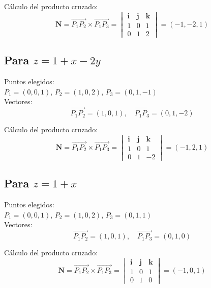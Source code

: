 \documentclass{article}
\begin{document}
Cálculo del producto cruzado:
\begin{equation*}
    \mathbf{N} = \overrightarrow{P_1P_2} \times \overrightarrow{P_1P_3} =
    \begin{vmatrix} 
    \mathbf{i} & \mathbf{j} & \mathbf{k} \\
    1 & 0 & 1 \\
    0 & 1 & 2
    \end{vmatrix} = (-1, -2, 1)
\end{equation*}

\subsection{Para $z = 1 + x - 2y$}
Puntos elegidos: \\ 
$P_1 = (0,0,1)$, $P_2 = (1,0,2)$, $P_3 = (0,1,-1)$ \\  
Vectores:
\begin{equation*}
    \overrightarrow{P_1P_2} = (1,0,1), \quad \overrightarrow{P_1P_3} = (0,1,-2)
\end{equation*}

Cálculo del producto cruzado:
\begin{equation*}
    \mathbf{N} = \overrightarrow{P_1P_2} \times \overrightarrow{P_1P_3} =
    \begin{vmatrix} 
    \mathbf{i} & \mathbf{j} & \mathbf{k} \\
    1 & 0 & 1 \\
    0 & 1 & -2
    \end{vmatrix} = (-1, 2, 1)
\end{equation*}

\subsection{Para $z = 1 + x$}
Puntos elegidos: \\ 
$P_1 = (0,0,1)$, $P_2 = (1,0,2)$, $P_3 = (0,1,1)$ \\  
Vectores:
\begin{equation*}
    \overrightarrow{P_1P_2} = (1,0,1), \quad \overrightarrow{P_1P_3} = (0,1,0)
\end{equation*}

Cálculo del producto cruzado:
\begin{equation*}
    \mathbf{N} = \overrightarrow{P_1P_2} \times \overrightarrow{P_1P_3} =
    \begin{vmatrix} 
    \mathbf{i} & \mathbf{j} & \mathbf{k} \\
    1 & 0 & 1 \\
    0 & 1 & 0
    \end{vmatrix} = (-1, 0, 1)
\end{equation*}
\end{document}
